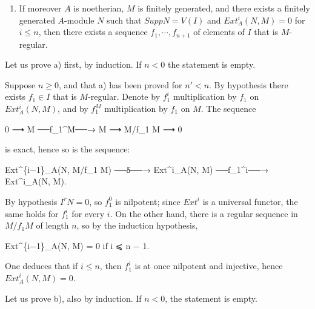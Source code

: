 \documentclass[
]{article}
\newenvironment{Shaded}{}{}
\newcommand{\NormalTok}[1]{#1}
\providecommand{\tightlist}{%
  \setlength{\itemsep}{0pt}\setlength{\parskip}{0pt}}
\begin{document}
\begin{enumerate}
\def\labelenumi{\alph{enumi})}
\setcounter{enumi}{1}
\tightlist
\item
  If moreover \(A\) is noetherian, \(M\) is finitely generated, and
  there exists a finitely generated \(A\)-module \(N\) such that
  \(Supp N = V(I)\) and \(Ext^{i}_{A}(N, M) = 0\) for \(i \leqslant n\),
  then there exists a sequence \(f_{1}, \cdots, f_{n+1}\) of elements of
  \(I\) that is \(M\)-regular.
\end{enumerate}

Let us prove a) first, by induction. If \(n < 0\) the statement is
empty.

Suppose \(n \geqslant 0\), and that a) has been proved for \(n' < n\).
By hypothesis there exists \(f_{1} \in I\) that is \(M\)-regular. Denote
by \(f^{i}_{1}\) multiplication by \(f_{1}\) on \(Ext^{i}_{A}(N, M)\),
and by \(f^{M}_{1}\) multiplication by \(f_{1}\) on \(M\). The sequence

\begin{Shaded}
\begin{Highlighting}[]
\NormalTok{0 ⟶ M ──f\_1\^{}M──→ M ⟶ M/f\_1 M ⟶ 0}
\end{Highlighting}
\end{Shaded}

is exact, hence so is the sequence:

\begin{Shaded}
\begin{Highlighting}[]
\NormalTok{Ext\^{}\{i−1\}\_A(N, M/f\_1 M) ──δ──→ Ext\^{}i\_A(N, M) ──f\_1\^{}i──→ Ext\^{}i\_A(N, M).}
\end{Highlighting}
\end{Shaded}

By hypothesis \(I^{r} N = 0\), so \(f^{0}_{1}\) is nilpotent; since
\(Ext^{i}\) is a universal functor, the same holds for \(f^{i}_{1}\) for
every \(i\). On the other hand, there is a regular sequence in
\(M/f_{1} M\) of length \(n\), so by the induction hypothesis,

\begin{Shaded}
\begin{Highlighting}[]
\NormalTok{Ext\^{}\{i−1\}\_A(N, M) = 0 if i ⩽ n − 1.}
\end{Highlighting}
\end{Shaded}

One deduces that if \(i \leqslant n\), then \(f^{i}_{1}\) is at once
nilpotent and injective, hence \(Ext^{i}_{A}(N, M) = 0\).

Let us prove b), also by induction. If \(n < 0\), the statement is
empty.
\end{document}
